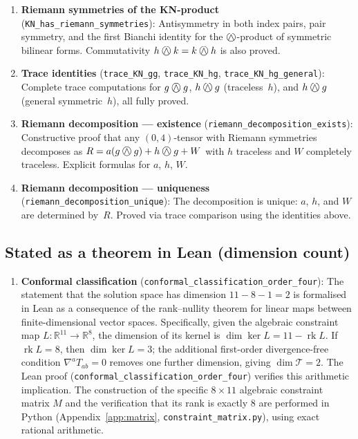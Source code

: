 \documentclass[11pt,a4paper]{article}
\newcommand{\owedge}{\mathbin{%
  \text{%
    \ooalign{%
      \hfil$\wedge$\hfil\cr
      \hfil\raisebox{0.05em}{$\bigcirc$}\hfil\cr
    }%
  }%
}}
\begin{document}
\begin{enumerate}
  \item \textbf{Riemann symmetries of the KN-product}
    (\texttt{KN\_has\_riemann\_symmetries}):
    Antisymmetry in both index pairs, pair symmetry, and the first Bianchi
    identity for the $\owedge$-product of symmetric bilinear forms.
    Commutativity $h\owedge k = k \owedge h$ is also proved.

  \item \textbf{Trace identities}
    (\texttt{trace\_KN\_gg}, \texttt{trace\_KN\_hg},
     \texttt{trace\_KN\_hg\_general}):
    Complete trace computations for $g\owedge g$, $h\owedge g$ (traceless~$h$),
    and $h\owedge g$ (general symmetric~$h$), all fully proved.

  \item \textbf{Riemann decomposition --- existence}
    (\texttt{riemann\_decomposition\_exists}):
    Constructive proof that any $(0,4)$-tensor with Riemann symmetries
    decomposes as $R = a(g\owedge g) + h\owedge g + W$ with $h$ traceless
    and $W$ completely traceless. Explicit formulas for $a$, $h$, $W$.

  \item \textbf{Riemann decomposition --- uniqueness}
    (\texttt{riemann\_decomposition\_unique}):
    The decomposition is unique: $a$, $h$, and $W$ are determined by~$R$.
    Proved via trace comparison using the identities above.
\end{enumerate}

\subsection{Stated as a theorem in Lean (dimension count)}

\begin{enumerate}[resume]
  \item \textbf{Conformal classification}
    (\texttt{conformal\_classification\_order\_four}):
    The statement that the solution space has dimension
    $11 - 8 - 1 = 2$ is
    formalised in Lean as a consequence of the rank--nullity theorem for
    linear maps between finite-dimensional vector spaces. Specifically,
    given the algebraic constraint map $L: \mathbb{R}^{11} \to \mathbb{R}^8$,
    the dimension of its kernel is $\dim\ker L = 11 - \operatorname{rk}L$.
    If $\operatorname{rk}L = 8$, then $\dim\ker L = 3$; the additional
    first-order divergence-free condition $\nabla^a T_{ab} = 0$ removes one
    further dimension, giving $\dim\mathcal{T} = 2$. The Lean proof
    (\texttt{conformal\_classification\_order\_four}) verifies this
    arithmetic implication. The construction of the specific $8 \times 11$
    algebraic constraint matrix $M$ and the verification that its rank is
    exactly $8$ are performed in Python (Appendix~\ref{app:matrix},
    \texttt{constraint\_matrix.py}),
    using exact rational arithmetic.
\end{enumerate}
\end{document}
